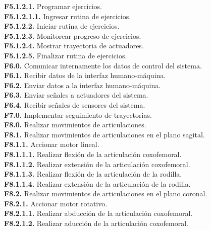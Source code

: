  \textbf{F5.1.2.1.} Programar ejercicios.\\
 \textbf{F5.1.2.1.1.} Ingresar rutina de ejercicios.\\
 \textbf{F5.1.2.2.} Iniciar rutina de ejercicios.\\
 \textbf{F5.1.2.3.} Monitorear progreso de ejercicios.\\
 \textbf{F5.1.2.4.} Mostrar trayectoria de actuadores.\\
 \textbf{F5.1.2.5.} Finalizar rutina de ejercicios.\\
 \textbf{F6.0.} Comunicar internamente los datos de control del sistema.\\
 \textbf{F6.1.} Recibir datos de la interfaz humano-máquina.\\
 \textbf{F6.2.} Enviar datos a la interfaz humano-máquina.\\
 \textbf{F6.3.} Enviar señales a actuadores del sistema.\\
 \textbf{F6.4.} Recibir señales de sensores del sistema.\\
 \textbf{F7.0.} Implementar seguimiento de trayectorias.\\
 \textbf{F8.0.} Realizar movimientos de articulaciones.\\
 \textbf{F8.1.} Realizar movimientos de articulaciones en el plano sagital.\\
 \textbf{F8.1.1.} Accionar motor lineal.\\
 \textbf{F8.1.1.1.} Realizar flexión de la articulación coxofemoral.\\
 \textbf{F8.1.1.2.} Realizar extensión de la articulación coxofemoral.\\
 \textbf{F8.1.1.3.} Realizar flexión de la articulación de la rodilla.\\
 \textbf{F8.1.1.4.} Realizar extensión de la articulación de la rodilla.\\
 \textbf{F8.2.} Realizar movimientos de articulaciones en el plano coronal.\\
 \textbf{F8.2.1.} Accionar motor rotativo.\\
 \textbf{F8.2.1.1.} Realizar abducción de la articulación coxofemoral.\\
 \textbf{F8.2.1.2.} Realizar aducción de la articulación coxofemoral.\\



